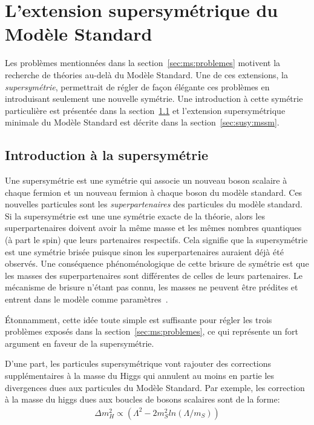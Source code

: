 \singlespacing{}
\chapter{L'extension supersymétrique du Modèle Standard}
\label{sec:susy}
\doublespacing{}

Les problèmes mentionnées dans la section~\ref{sec:ms:problemes}
motivent la recherche de théories au-delà du Modèle Standard. Une de
ces extensions, la \emph{supersymétrie}, permettrait de régler de
façon élégante ces problèmes en introduisant seulement une nouvelle
symétrie. Une introduction à cette symétrie
particulière est présentée dans la section~\ref{sec:susy:th} et
l'extension supersymétrique minimale du Modèle Standard est décrite
dans la section~\ref{sec:susy:mssm}.

\section{Introduction à la supersymétrie}
\label{sec:susy:th}

Une supersymétrie est une symétrie qui associe un nouveau boson
scalaire à chaque fermion et un nouveau fermion à chaque boson du
modèle standard. Ces nouvelles particules sont les
\emph{superpartenaires} des particules du modèle standard. Si la supersymétrie est
une une symétrie exacte de la théorie, alors les superpartenaires
doivent avoir la même masse et les mêmes nombres quantiques (à part le
spin) que leurs partenaires respectifs. Cela signifie que la
supersymétrie est une symétrie brisée puisque sinon les superpartenaires
auraient déjà été observés. Une conséquence phénoménologique de cette
brisure de symétrie est que les masses des superpartenaires sont
différentes de celles de leurs partenaires. Le mécanisme de brisure
n'étant pas connu, les masses ne peuvent être prédites et entrent dans
le modèle comme paramètres~\cite{olive_susy1_2014}.

Étonnamment, cette idée toute simple est suffisante pour régler les
trois problèmes exposés dans la section~\ref{sec:ms:problemes}, ce qui
représente un fort argument en faveur de la supersymétrie. 

D'une part, les particules supersymétrique vont rajouter des
corrections supplémentaires à la masse du Higgs qui annulent au moins
en partie les divergences dues aux particules du Modèle Standard. Par
exemple, les correction à la masse du higgs dues aux boucles de bosons
scalaires sont de la forme:
\begin{eqnarray}
  \Delta m_H^2 \propto 
  \left(
  \Lambda^2 - 2m^2_S ln(\Lambda/m_S)
  \right)
\end{eqnarray}

